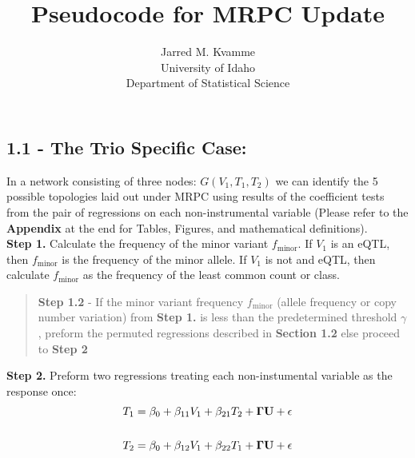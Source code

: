 \documentclass[12pt]{report}
\begin{document}
\begin{titlepage}
\title{Pseudocode for MRPC Update}
\author{ Jarred M. Kvamme \\ University of Idaho \\ Department of Statistical Science }
\maketitle
\end{titlepage}

\newcommand{\indep}{\perp \!\!\! \perp}



\subsection*{1.1 - The Trio Specific Case:}

In a network consisting of three nodes: $G(V_1, T_1, T_2)$ we can identify the 5 possible topologies laid out under MRPC using results of the coefficient tests from the pair of regressions on each non-instrumental variable (Please refer to the \textbf{Appendix} at the end for Tables, Figures, and mathematical definitions).\\

\noindent \textbf{Step 1.} Calculate the frequency of the minor variant $f_{\text{minor}}$. If $V_1$ is an eQTL, then $f_{\text{minor}}$ is the frequency of the minor allele. If $V_1$ is not and eQTL, then calculate $f_{\text{minor}}$ as the frequency of the least common count or class. \\

\begin{quote}
\textbf{Step 1.2} - If the minor variant frequency $f_{\text{minor}}$ (allele frequency or copy number variation) from \textbf{Step 1.} is less than the predetermined threshold $\gamma$, preform the permuted regressions described in \textbf{Section 1.2} else proceed to \textbf{Step 2}
\end{quote}

\noindent \textbf{Step 2.} Preform two regressions treating each non-instumental variable as the response once:  
\begin{eqnarray}
T_1 = \beta_0 +\beta_{11}V_1+\beta_{21}T_2+{\bf \Gamma U}+ \epsilon \\
\nonumber\\
T_2 = \beta_0 +\beta_{12}V_1+\beta_{22}T_1+{\bf \Gamma U}+ \epsilon 
\end{eqnarray}
\end{document}
